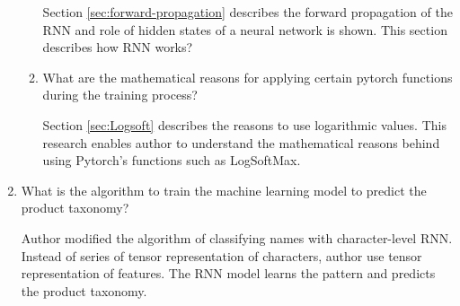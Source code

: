 \begin{enumerate}[label=\textbf{RQ\arabic*:}]
\begin{enumerate}[label=\textbf{SRQ\arabic*:}]
        Section \ref{sec:forward-propagation} describes the forward propagation of the \acf*{RNN} and role of hidden states of a neural network is shown. This section describes how \acs{RNN} works? 

        \item What are the mathematical reasons for applying certain pytorch functions during the training process? 
        
        Section \ref{sec:Logsoft} describes the reasons to use logarithmic values. This research enables author to understand the mathematical reasons behind using Pytorch's functions such as LogSoftMax.         

    \end{enumerate}
    
    \item What is the algorithm to train the machine learning model to predict the product taxonomy?
        
    Author modified the algorithm of \parencite{sean}   classifying names with character-level RNN. Instead of series of tensor representation of characters, author use tensor representation of features. The RNN model learns the pattern and predicts the product taxonomy.

  \end{enumerate}


  